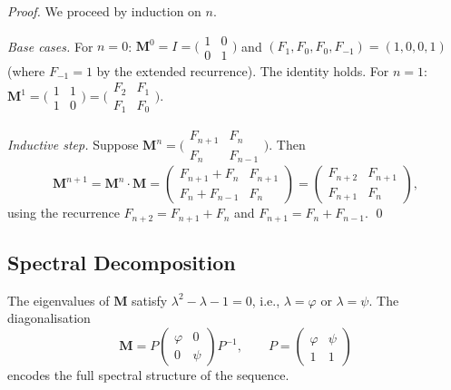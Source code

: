 \begin{proof}
We proceed by induction on \(n\).

\emph{Base cases.}
  For \(n = 0\): \(\mathbf{M}^0 = I = \bigl(\begin{smallmatrix}1&0\\0&1\end{smallmatrix}\bigr)\)
  and \((F_1,F_0,F_0,F_{-1}) = (1,0,0,1)\) (where \(F_{-1} = 1\) by the
  extended recurrence).  The identity holds.
  For \(n = 1\): \(\mathbf{M}^1 = \bigl(\begin{smallmatrix}1&1\\1&0\end{smallmatrix}\bigr)
  = \bigl(\begin{smallmatrix}F_2&F_1\\F_1&F_0\end{smallmatrix}\bigr)\). \checkmark

\emph{Inductive step.}
  Suppose \(\mathbf{M}^n = \bigl(\begin{smallmatrix}F_{n+1}&F_n\\F_n&F_{n-1}\end{smallmatrix}\bigr)\).
  Then
  \[
    \mathbf{M}^{n+1} = \mathbf{M}^n \cdot \mathbf{M}
    = \begin{pmatrix}F_{n+1}+F_n & F_{n+1}\\F_n+F_{n-1}&F_n\end{pmatrix}
    = \begin{pmatrix}F_{n+2}&F_{n+1}\\F_{n+1}&F_n\end{pmatrix},
  \]
  using the recurrence \(F_{n+2} = F_{n+1} + F_n\) and
  \(F_{n+1} = F_n + F_{n-1}\).
\qed
\end{proof}

\subsection{Spectral Decomposition}\label{subsec:ch7-spectral}

The eigenvalues of \(\mathbf{M}\) satisfy \(\lambda^2 - \lambda - 1 = 0\),
i.e., \(\lambda = \varphi\) or \(\lambda = \psi\).  The diagonalisation
\[
  \mathbf{M} = P \begin{pmatrix}\varphi & 0 \\ 0 & \psi\end{pmatrix} P^{-1},
  \qquad P = \begin{pmatrix}\varphi & \psi \\ 1 & 1\end{pmatrix}
\]
encodes the full spectral structure of the sequence.

